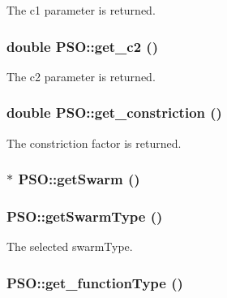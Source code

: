 The c1 parameter is returned. 

\hypertarget{classPSO_39340d6c779a00395bca0b293aa081a9}{
\subsubsection{\setlength{\rightskip}{0pt plus 5cm}double PSO::get\_\-c2 ()}}
\label{classPSO_39340d6c779a00395bca0b293aa081a9}


The c2 parameter is returned. 

\hypertarget{classPSO_13988ca5dfb95908547160ba71cf8c00}{
\subsubsection{\setlength{\rightskip}{0pt plus 5cm}double PSO::get\_\-constriction ()}}
\label{classPSO_13988ca5dfb95908547160ba71cf8c00}


The constriction factor is returned. 

\hypertarget{classPSO_73b6f8b856198c230a8e8820c0ff9754}{
\subsubsection{$\ast$ PSO::getSwarm ()}}
\label{classPSO_73b6f8b856198c230a8e8820c0ff9754}


\hypertarget{classPSO_51207ecdeef9436d6096923687b029d5}{
\subsubsection{ PSO::getSwarmType ()}}
\label{classPSO_51207ecdeef9436d6096923687b029d5}


The selected swarmType. 

\hypertarget{classPSO_83130a91287e0dbf1f818bf1b91d382e}{
\subsubsection{ PSO::get\_\-functionType ()}}
\label{classPSO_83130a91287e0dbf1f818bf1b91d382e}


